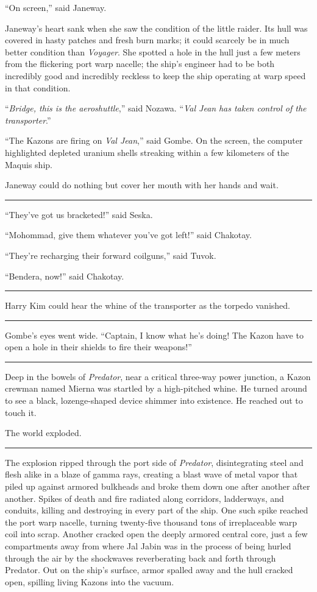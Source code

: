 \documentclass[twoside,letterpaper,12pt]{memoir}
\begin{document}
``On screen,'' said Janeway.

Janeway's heart sank when she saw the condition of the little raider. Its hull was covered in hasty patches and fresh burn marks; it could scarcely be in much better condition than \textit{Voyager}. She spotted a hole in the hull just a few meters from the flickering port warp nacelle; the ship's engineer had to be both incredibly good and incredibly reckless to keep the ship operating at warp speed in that condition.

``\textit{Bridge, this is the aeroshuttle},'' said Nozawa. ``\textit{Val Jean} \textit{has taken control of the transporter}.''

``The Kazons are firing on \textit{Val Jean},'' said Gombe. On the screen, the computer highlighted depleted uranium shells streaking within a few kilometers of the Maquis ship.

Janeway could do nothing but cover her mouth with her hands and wait.

\fancybreak{\rule{3cm}{0.4 pt}}
``They've got us bracketed!'' said Seska.

``Mohommad, give them whatever you've got left!'' said Chakotay.

``They're recharging their forward coilguns,'' said Tuvok.

``Bendera, now!'' said Chakotay.

\fancybreak{\rule{3cm}{0.4 pt}}
Harry Kim could hear the whine of the transporter as the torpedo vanished.

\fancybreak{\rule{3cm}{0.4 pt}}
Gombe's eyes went wide. ``Captain, I know what he's doing! The Kazon have to open a hole in their shields to fire their weapons!''

\fancybreak{\rule{3cm}{0.4 pt}}
Deep in the bowels of \textit{Predator}, near a critical three-way power junction, a Kazon crewman named Mierna was startled by a high-pitched whine. He turned around to see a black, lozenge-shaped device shimmer into existence. He reached out to touch it.

The world exploded.

\fancybreak{\rule{3cm}{0.4 pt}}
The explosion ripped through the port side of \textit{Predator}, disintegrating steel and flesh alike in a blaze of gamma rays, creating a blast wave of metal vapor that piled up against armored bulkheads and broke them down one after another after another. Spikes of death and fire radiated along corridors, ladderways, and conduits, killing and destroying in every part of the ship. One such spike reached the port warp nacelle, turning twenty-five thousand tons of irreplaceable warp coil into scrap. Another cracked open the deeply armored central core, just a few compartments away from where Jal Jabin was in the process of being hurled through the air by the shockwaves reverberating back and forth through Predator. Out on the ship's surface, armor spalled away and the hull cracked open, spilling living Kazons into the vacuum.
\end{document}
